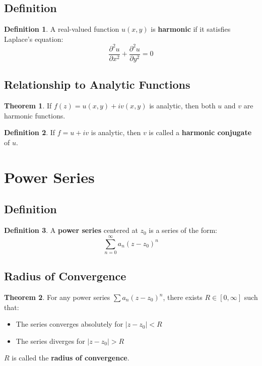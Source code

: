 \documentclass[11pt]{article}
\theoremstyle{definition}
\newtheorem{definition}{Definition}[section]
\newtheorem{theorem}{Theorem}[section]
\begin{document}
\subsection{Definition}
\begin{definition}
A real-valued function $u(x,y)$ is \textbf{harmonic} if it satisfies Laplace's equation:
$$\frac{\partial^2 u}{\partial x^2} + \frac{\partial^2 u}{\partial y^2} = 0$$
\end{definition}

\subsection{Relationship to Analytic Functions}
\begin{theorem}
If $f(z) = u(x,y) + iv(x,y)$ is analytic, then both $u$ and $v$ are harmonic functions.
\end{theorem}

\begin{definition}
If $f = u + iv$ is analytic, then $v$ is called a \textbf{harmonic conjugate} of $u$.
\end{definition}

\section{Power Series}

\subsection{Definition}
\begin{definition}
A \textbf{power series} centered at $z_0$ is a series of the form:
$$\sum_{n=0}^{\infty} a_n (z - z_0)^n$$
\end{definition}

\subsection{Radius of Convergence}
\begin{theorem}
For any power series $\sum a_n (z - z_0)^n$, there exists $R \in [0, \infty]$ such that:
\begin{itemize}
    \item The series converges absolutely for $|z - z_0| < R$
    \item The series diverges for $|z - z_0| > R$
\end{itemize}
$R$ is called the \textbf{radius of convergence}.
\end{theorem}
\end{document}
